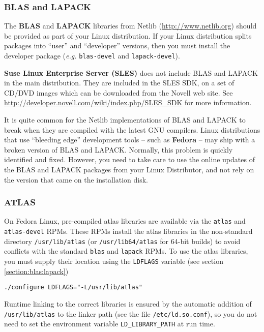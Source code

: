 \documentclass[11pt, a4paper, titlepage]{report}
\begin{document}
\subsubsection{BLAS and LAPACK}

The {\bf BLAS} and {\bf LAPACK} libraries from Netlib
(\url{http://www.netlib.org}) should be provided as part of your Linux
distribution. If your Linux distribution splits packages into ``user''
and ``developer'' versions, then you must install the developer
package ({\em e.g.}  \texttt{blas-devel} and \texttt{lapack-devel}).

{\bf Suse Linux Enterprise Server (SLES)} does not include BLAS and
LAPACK in the main distribution. They are included in the SLES SDK, on
a set of CD/DVD images which can be downloaded from the Novell web
site.  See \url{http://developer.novell.com/wiki/index.php/SLES_SDK}
for more information.

It is quite common for the Netlib implementations of BLAS and LAPACK
to break when they are compiled with the latest GNU compilers.  Linux
distributions that use ``bleeding edge'' development tools -- such as
{\bf Fedora} -- may ship with a broken version of BLAS and
LAPACK. Normally, this problem is quickly identified and
fixed. However, you need to take care to use the online updates of the
BLAS and LAPACK packages from your Linux Distributor, and not rely on
the version that came on the installation disk.

\subsubsection{ATLAS}

On Fedora Linux, pre-compiled atlas libraries are available via the
\texttt{atlas} and \texttt{atlas-devel} RPMs.  These RPMs install the
atlas libraries in the non-standard directory \texttt{/usr/lib/atlas}
(or \texttt{/usr/lib64/atlas} for 64-bit builds) to avoid conflicts
with the standard \texttt{blas} and \texttt{lapack} RPMs. To use the
atlas libraries, you must supply their location using the
\verb+LDFLAGS+ variable (see section \ref{section:blas:lapack})
\begin{verbatim}
./configure LDFLAGS="-L/usr/lib/atlas"
\end{verbatim}
Runtime linking to the correct libraries is ensured by the automatic
addition of \texttt{/usr/lib/atlas} to the linker path (see the file
\texttt{/etc/ld.so.conf}), so you do not need to set the
environment variable \verb+LD_LIBRARY_PATH+ at run time.
\end{document}
